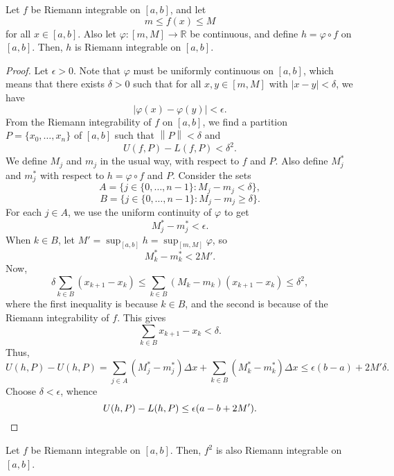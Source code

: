 \documentclass[11pt]{article}
\def\R{\mathbb{R}}
\newcommand\norm[1]{\left\lVert#1\right\rVert}
\theoremstyle{definition}
\theoremstyle{remark}
\numberwithin{equation}{module}
\begin{document}
    \begin{theorem}
        Let $f$ be Riemann integrable on $[a, b]$, and let \[
            m \leq f(x) \leq M
        \] for all $x \in [a, b]$. Also let $\varphi\colon [m, M] \to \R$ be
        continuous, and define $h = \varphi \circ f$ on $[a, b]$. Then, $h$ is
        Riemann integrable on $[a, b]$.
    \end{theorem}
    \begin{proof}
        Let $\epsilon > 0$. Note that $\varphi$ must be uniformly continuous on $[a,
        b]$, which means that there exists $\delta > 0$ such that for all $x, y \in
        [m, M]$ with $|x - y| < \delta$, we have \[
            |\varphi(x) - \varphi(y)| < \epsilon.
        \] From the Riemann integrability of $f$ on $[a, b]$, we find a partition
        $P = \{x_0, \dots, x_n\}$ of $[a, b]$ such that $\norm{P} < \delta$ and \[
            U(f, P) - L(f, P) < \delta^2.
        \] We define $M_j$ and $m_j$ in the usual way, with respect to $f$ and $P$.
        Also define $M_j^*$ and $m_j^*$ with respect to $h = \varphi\circ f$ and $P$.
        Consider the sets \[
            A = \{j \in \{0, \dots, n - 1\}\colon M_j - m_j < \delta\},
        \] \[
            B = \{j \in \{0, \dots, n - 1\}\colon M_j - m_j \geq \delta\}.
        \] For each $j \in A$, we use the uniform continuity of $\varphi$ to get \[
            M_j^* - m_j^* < \epsilon.
        \] When $k \in B$, let $M' = \sup_{[a, b]} h = \sup_{[m, M]} \varphi$, so \[
            M_k^* - m_k^* < 2M'.
        \] Now, \[
            \delta\sum_{k \in B} (x_{k + 1} - x_k) \leq \sum_{k \in B} (M_k -
            m_k)(x_{k + 1} - x_k) \leq \delta^2,
        \] where the first inequality is because $k \in B$, and the second is
        because of the Riemann integrability of $f$. This gives \[
            \sum_{k \in B} x_{k + 1} - x_k < \delta.
        \] Thus, \[
            U(h, P) - U(h, P) = \sum_{j \in A} (M_j^* - m_j^*)\Delta x + \sum_{k \in
            B} (M_k^* - m_k^*)\Delta x \leq \epsilon(b - a) + 2M'\delta.
        \] Choose $\delta < \epsilon$, whence \[
            U(h, P) - L(h, P) \leq \epsilon(a - b + 2M'). \qedhere
        \] 

    \end{proof}
    
    \begin{corollary}
        Let $f$ be Riemann integrable on $[a, b]$. Then, $f^2$ is also Riemann
        integrable on $[a, b]$.
    \end{corollary}
\end{document}
